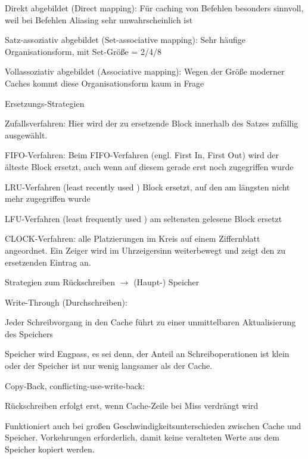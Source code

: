 \documentclass[10pt,landscape]{article}
\begin{document}
\begin{multicols}{3}
\begin{itemize*}
    \item Direkt abgebildet (Direct mapping): Für caching von Befehlen besonders sinnvoll, weil bei Befehlen Aliasing sehr unwahrscheinlich ist
    \item Satz-assoziativ abgebildet (Set-associative mapping): Sehr häufige Organisationsform, mit Set-Größe = 2/4/8
    \item Vollassoziativ abgebildet (Associative mapping): Wegen der Größe moderner Caches kommt diese Organisationsform kaum in Frage
    \item Ersetzungs-Strategien
    \begin{itemize*}
      \item Zufallsverfahren: Hier wird der zu ersetzende Block innerhalb des Satzes zufällig ausgewählt.
      \item FIFO-Verfahren: Beim FIFO-Verfahren (engl. First In, First Out) wird der älteste Block ersetzt, auch wenn auf diesem gerade erst noch zugegriffen wurde
      \item LRU-Verfahren (least recently used ) Block ersetzt, auf den am längsten nicht mehr zugegriffen wurde
      \item LFU-Verfahren (least frequently used ) am seltensten gelesene Block ersetzt
      \item CLOCK-Verfahren: alle Platzierungen im Kreis auf einem Ziffernblatt angeordnet. Ein Zeiger wird im Uhrzeigersinn weiterbewegt und zeigt den zu ersetzenden Eintrag an.
    \end{itemize*}
  \end{itemize*}
  
  Strategien zum Rückschreiben $\rightarrow$ (Haupt-) Speicher
  \begin{itemize*}
    \item Write-Through (Durchschreiben):
    \item Jeder Schreibvorgang in den Cache führt zu einer unmittelbaren Aktualisierung des Speichers
    \item  Speicher wird Engpass, es sei denn, der Anteil an Schreiboperationen ist klein oder der Speicher ist nur wenig langsamer als der Cache.
    \item Copy-Back, conflicting-use-write-back:
    \item Rückschreiben erfolgt erst, wenn Cache-Zeile bei Miss verdrängt wird
    \item Funktioniert auch bei großen Geschwindigkeitsunterschieden zwischen Cache und Speicher. Vorkehrungen erforderlich, damit keine veralteten Werte aus dem Speicher kopiert werden.
  \end{itemize*}
  

\end{multicols}
\end{document}
